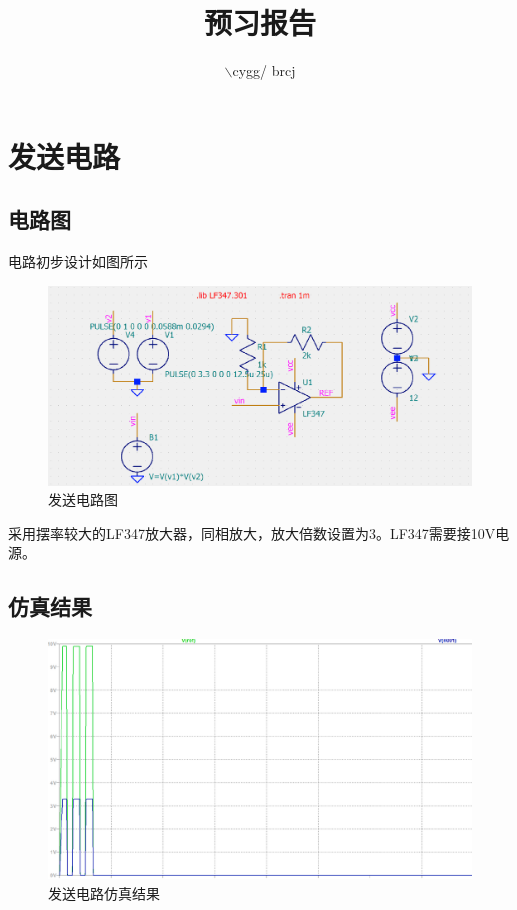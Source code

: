 \documentclass{article}
\title{预习报告}
\author{$\backslash$cygg/ brcj}
\begin{document}
\maketitle

\section{发送电路}
\subsection{电路图}
电路初步设计如图所示
\begin{figure}[H]
    \centering
    \includegraphics[width = 12cm]{images/tx_cir.png}
    \caption{发送电路图}\label{fig1}
\end{figure}
采用摆率较大的LF347放大器，同相放大，放大倍数设置为3。LF347需要接10V电源。
\subsection{仿真结果}
\begin{figure}[H]
    \centering
    \includegraphics[width = 12cm]{images/tx_waveform.png}
    \caption{发送电路仿真结果}\label{fig2}
\end{figure}
\end{document}
